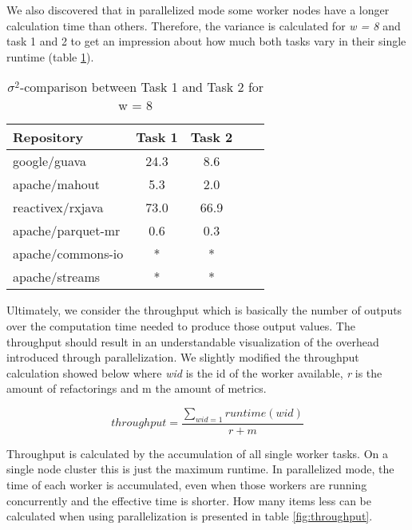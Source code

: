 We also discovered that in parallelized mode some worker nodes have a longer calculation time than others. Therefore, the variance is calculated for \emph{w = 8} and task 1 and 2 to get an impression about how much both tasks vary in their single runtime (table \ref{tab:variance}).

\begin{table}[htbp]
\caption{$\sigma^2$-comparison between Task 1 and Task 2 for w = 8}
\label{tab:variance}
\begin{center}
\begin{tabular}{|l|c|c|c|c|}
\hline
\textbf{Repository}&  \textbf{Task 1}&\textbf{Task 2}\\
\hline
google/guava& 24.3 & 8.6\\
\hline
apache/mahout& 5.3 & 2.0\\
\hline
reactivex/rxjava& 73.0 & 66.9\\
\hline
apache/parquet-mr& 0.6 & 0.3\\
\hline
apache/commons-io& * & *\\
\hline
apache/streams& * & *\\
\hline
\end{tabular}
\end{center}
\end{table}

Ultimately, we consider the throughput which is basically the number of outputs over the computation time needed to produce those output values. The throughput should result in an understandable visualization of the overhead introduced through parallelization. We slightly modified the throughput calculation showed below where \emph{wid} is the id of the worker available, \emph{r} is the amount of refactorings and m the amount of metrics.

\begin{equation*}
    throughput = \frac{\sum_{wid=1}{runtime(wid)}}{r+m}
\end{equation*}

Throughput is calculated by the accumulation of all single worker tasks. On a single node cluster this is just the maximum runtime. In parallelized mode, the time of each worker is accumulated, even when those workers are running concurrently and the effective time is shorter. How many items less can be calculated when using parallelization is presented in table \ref{fig:throughput}.


